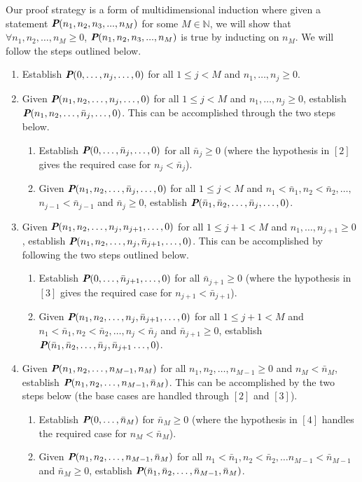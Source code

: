 \begin{remark}
Our proof strategy is a form of multidimensional induction where given a statement $\textit{\textbf{P}}(n_1, n_2, n_3, ..., n_M)$ for some $M\in \mathbb{N}$, we will show that $\forall n_1, n_2,\ldots, n_M \geq 0$, $\textit{\textbf{P}}(n_1, n_2, n_3, ..., n_M)$ is true by inducting on $n_M$. We will follow the steps outlined below.
\begin{enumerate}
\item Establish $\textit{\textbf{P}}(0,\ldots,n_j,\ldots,0)$ for all $1 \leq j < M$ and $n_1,\ldots,n_j \geq 0.$
\item Given $\textit{\textbf{P}}(n_1,n_2,\ldots,n_j,\ldots,0)$ for all $1 \leq j < M$ and $n_1,\ldots,n_j \geq 0$, establish $\textit{\textbf{P}}(n_1,n_2,\ldots,\bar{n}_j,\ldots,0)$. This can be accomplished through the two steps below.
\begin{enumerate}
    \item Establish $\textit{\textbf{P}}(0,\ldots,\bar{n}_j,\ldots,0)$ for all $\bar{n}_j \geq 0$ (where the hypothesis in $[2]$ gives the required case for $n_j < \bar{n}_j$).
    \item Given  $\textit{\textbf{P}}(n_1,n_2,\ldots,\bar{n}_j,\ldots,0)$ for all $1 \leq j < M$ and $n_1 < \bar{n}_1,  n_2 < \bar{n}_2,\ldots, $ $n_{j-1}  < \bar{n}_{j-1}$ and $\bar{n}_j\geq 0$, establish $\textit{\textbf{P}}(\bar{n}_1,\bar{n}_2,\ldots,\bar{n}_j,\ldots,0)$.
\end{enumerate}
\item Given $\textit{\textbf{P}}(n_1,n_2,\ldots,n_j,n_{j+1},\ldots,0)$ for all $1 \leq j+1 < M$ and $n_1,\ldots,n_{j+1} \geq 0$, establish $\textit{\textbf{P}}(n_1,n_2,\ldots,n_j,\bar{n}_{j+1},\ldots,0)$. This can be accomplished by following the two steps outlined below. 
\begin{enumerate}
    \item Establish $\textit{\textbf{P}}(0,\ldots,\bar{n}_{j+1},\ldots,0)$ for all $\bar{n}_{j+1} \geq 0$ (where the hypothesis in $[3]$ gives the required case for $n_{j+1} < \bar{n}_{j+1}$).
    \item Given  $\textit{\textbf{P}}(n_1,n_2,\ldots,n_j,\bar{n}_{j+1},\ldots,0)$ for all $1 \leq j+1 < M$ and  $n_1 < \bar{n}_1,  n_2 < \bar{n}_2,\ldots, n_{j} < \bar{n}_{j}$ and $\bar{n}_{j+1}\geq 0$, establish $\textit{\textbf{P}}(\bar{n}_1,\bar{n}_2,\ldots,\bar{n}_j,\bar{n}_{j+1}\ldots,0)$.
\end{enumerate}
\item Given $\textit{\textbf{P}}(n_1,n_2,\ldots,n_{M-1},n_M)$ for all $n_1,n_2,\ldots,n_{M-1} \geq 0$ and $n_M < \bar{n}_M$, establish $\textit{\textbf{P}}(n_1,n_2,\ldots,n_{M-1},\bar{n}_M)$. This can be accomplished by the two steps below (the base cases are handled through $[2]$ and $[3]$).
\begin{enumerate}
    \item Establish $\textit{\textbf{P}}(0,\ldots,\bar{n}_{M})$ for $\bar{n}_{M} \geq 0$ (where the hypothesis in $[4]$ handles the required case for  $n_{M} < \bar{n}_{M}$).
    \item Given $\textit{\textbf{P}}(n_1,n_2,\ldots,n_{M-1},\bar{n}_M)$ for all $n_1 < \bar{n}_1, n_2 < \bar{n}_2, \ldots n_{M-1} < \bar{n}_{M-1}$ and $\bar{n}_M \geq 0$, establish $\textit{\textbf{P}}(\bar{n}_1,\bar{n}_2,\ldots,\bar{n}_{M-1},\bar{n}_M)$.
\end{enumerate}
\end{enumerate}

\end{remark}

